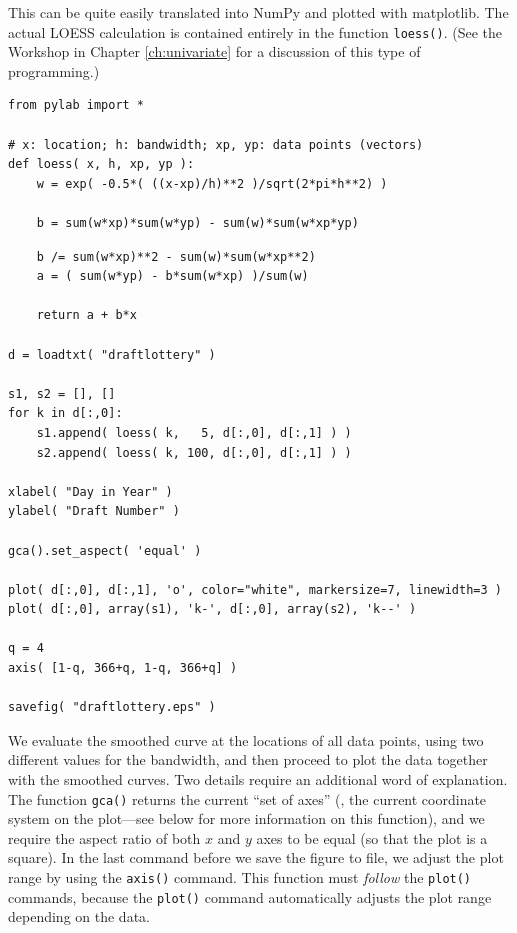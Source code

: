This can be quite easily translated into NumPy and plotted with
matplotlib. The actual LOESS calculation is contained entirely in the
function \texttt{loess()}.  (See the Workshop in Chapter
\ref{ch:univariate} for a discussion of this type of programming.)\vspace*{6pt}

\begin{verbatim}
from pylab import *

# x: location; h: bandwidth; xp, yp: data points (vectors)
def loess( x, h, xp, yp ):
    w = exp( -0.5*( ((x-xp)/h)**2 )/sqrt(2*pi*h**2) )

    b = sum(w*xp)*sum(w*yp) - sum(w)*sum(w*xp*yp)
\end{verbatim}

\begin{verbatim}
    b /= sum(w*xp)**2 - sum(w)*sum(w*xp**2)
    a = ( sum(w*yp) - b*sum(w*xp) )/sum(w)

    return a + b*x

d = loadtxt( "draftlottery" )

s1, s2 = [], []
for k in d[:,0]:
    s1.append( loess( k,   5, d[:,0], d[:,1] ) )
    s2.append( loess( k, 100, d[:,0], d[:,1] ) )

xlabel( "Day in Year" )
ylabel( "Draft Number" )

gca().set_aspect( 'equal' )

plot( d[:,0], d[:,1], 'o', color="white", markersize=7, linewidth=3 )
plot( d[:,0], array(s1), 'k-', d[:,0], array(s2), 'k--' )

q = 4
axis( [1-q, 366+q, 1-q, 366+q] )

savefig( "draftlottery.eps" )
\end{verbatim}

We evaluate the smoothed curve at the locations of all data points,
using two different values for the bandwidth, and then proceed to plot
the data together with the smoothed curves. Two details require an
additional word of explanation.  The function \texttt{gca()} returns
the current ``set of axes'' (\ie, the current coordinate system on the
plot---see below for more information on this function), and we
require the aspect ratio of both $x$ and $y$ axes to be equal (so that
the plot is a square). In the last command before we save the figure
to file, we adjust the plot range by using the \texttt{axis()}
command. This function must \emph{follow} the \texttt{plot()}
commands, because the \texttt{plot()} command automatically adjusts
the plot range depending on the data.\vspace*{-18pt}


